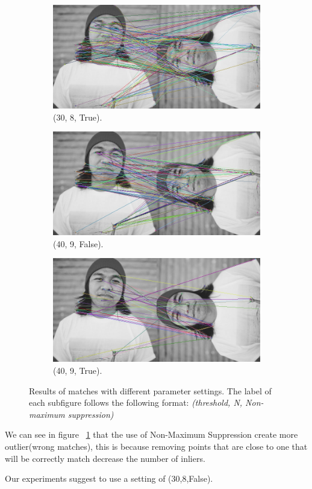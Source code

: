 \begin{figure}[h!]
\begin{subfigure}{0.5\textwidth}
  \centering
  \includegraphics[width=0.9\linewidth]{figs/match-30-8-true.jpg}
  \caption{(30, 8, True).}
\end{subfigure}
\begin{subfigure}{0.5\textwidth}
  \centering
  \includegraphics[width=0.9\linewidth]{figs/match-40-9-false.jpg}
  \caption{(40, 9, False).}
\end{subfigure}%
\begin{subfigure}{0.5\textwidth}
  \centering
  \includegraphics[width=0.9\linewidth]{figs/match-40-9-true.jpg}
  \caption{(40, 9, True).}
\end{subfigure}
 \caption{Results of matches with different parameter settings. The label of each subfigure follows the following format: \textit{(threshold, N, Non-maximum suppression)}}
\label{fig:keypoints-match}
\end{figure}

We can see in figure ~\ref{fig:keypoints-match} that the use of Non-Maximum Suppression create more outlier(wrong matches), this is because removing points that are close to one that will be correctly match decrease the number of inliers.


Our experiments suggest to use a setting of (30,8,False). 

